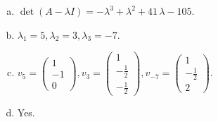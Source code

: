 \begin{questions}
\begin{solution}
\begin{enumerate}[(a)]
\item $\det(A-\lambda I)=-{\lambda}^{3} + {\lambda}^{2} + 41 \, {\lambda} - 105$.
\item ${\lambda}_1=5, {\lambda}_2=3, {\lambda}_3=-7$.
\item $v_{5}=\left(\begin{array}{r}
1 \\
-1 \\
0
\end{array}\right), v_{3}=\left(\begin{array}{r}
1 \\
-\frac{1}{2} \\
-\frac{1}{2}
\end{array}\right), v_{-7}=\left(\begin{array}{r}
1 \\
-\frac{1}{2} \\
2
\end{array}\right)$.
\item Yes.
\end{enumerate}
\end{solution}

\end{questions}

\newpage


\begin{center}
\end{center}

